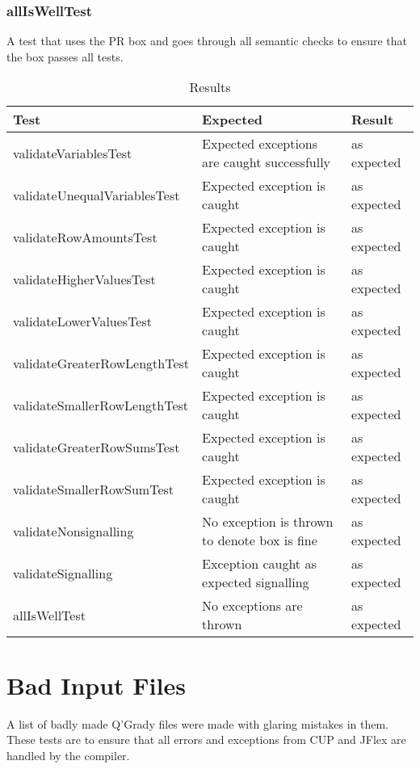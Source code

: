 \documentclass[report.tex]{subfiles}
\begin{document}
\subsubsection{allIsWellTest} %
\label{ssub:alliswelltest}
A test that uses the PR box and goes through all semantic checks to ensure that
the box passes all tests.
\newpage
\begin{table}[H]
    \centering
    \begin{tabular}{l | p{6cm} | l}
    Test & Expected & Result \\    
    \hline
    validateVariablesTest & Expected exceptions are caught successfully 
    & as expected \\
    validateUnequalVariablesTest & Expected exception is caught 
    & as expected \\
    validateRowAmountsTest & Expected exception is caught & as expected \\
    validateHigherValuesTest & Expected exception is caught & as expected \\
    validateLowerValuesTest & Expected exception is caught & as expected \\
    validateGreaterRowLengthTest & Expected exception is caught & as expected \\
    validateSmallerRowLengthTest & Expected exception is caught & as expected \\
    validateGreaterRowSumsTest & Expected exception is caught & as expected \\
    validateSmallerRowSumTest & Expected exception is caught & as expected \\
    validateNonsignalling & No exception is thrown to denote box is fine & as expected \\
    validateSignalling & Exception caught as expected signalling & as expected \\
    allIsWellTest & No exceptions are thrown & as expected \\
    \end{tabular}
    \caption{Results}
  \label{tab:semantics_summary}
\end{table}
\newpage

\section{Bad Input Files} %
\label{sec:bad_input_files}
A list of badly made Q'Grady files were made with glaring mistakes in them.
These tests are to ensure that all errors and exceptions from CUP and JFlex are
handled by the compiler.
\end{document}
